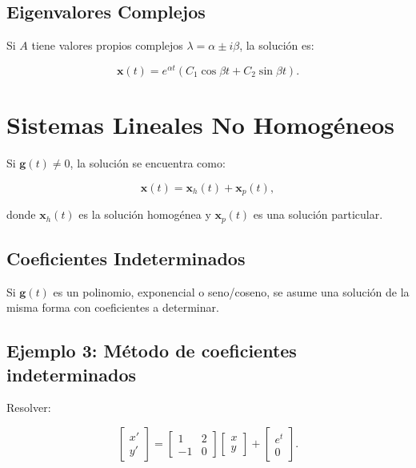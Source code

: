 \subsection{Eigenvalores Complejos}
Si \( A \) tiene valores propios complejos \( \lambda = \alpha \pm i\beta \), la solución es:

\begin{equation}
\mathbf{x}(t) = e^{\alpha t} (C_1 \cos \beta t + C_2 \sin \beta t).
\end{equation}

\section{Sistemas Lineales No Homogéneos}
Si \( \mathbf{g}(t) \neq 0 \), la solución se encuentra como:

\begin{equation}
\mathbf{x}(t) = \mathbf{x}_h(t) + \mathbf{x}_p(t),
\end{equation}

donde \( \mathbf{x}_h(t) \) es la solución homogénea y \( \mathbf{x}_p(t) \) es una solución particular.

\subsection{Coeficientes Indeterminados}
Si \( \mathbf{g}(t) \) es un polinomio, exponencial o seno/coseno, se asume una solución de la misma forma con coeficientes a determinar.

\subsection*{Ejemplo 3: Método de coeficientes indeterminados}
Resolver:

\begin{equation}
\begin{bmatrix} x' \\ y' \end{bmatrix} =
\begin{bmatrix} 1 & 2 \\ -1 & 0 \end{bmatrix}
\begin{bmatrix} x \\ y \end{bmatrix} +
\begin{bmatrix} e^t \\ 0 \end{bmatrix}.
\end{equation}

